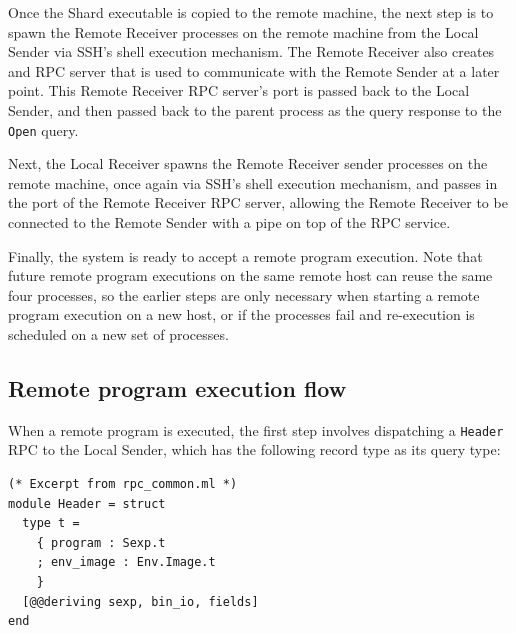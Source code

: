 \documentclass[oneside]{report}
\newcommand{\todoi}[1]{\todo[inline, color=blue!20]{TODO: {#1}}}
\begin{document}
Once the Shard executable is copied to the remote machine, the next step is to spawn the Remote Receiver processes on the remote machine from the Local Sender via SSH's shell execution mechanism.
The Remote Receiver also creates and RPC server that is used to communicate with the Remote Sender at a later point.
This Remote Receiver RPC server's port is passed back to the Local Sender, and then passed back to the parent process as the query response to the \texttt{Open} query.

Next, the Local Receiver spawns the Remote Receiver sender processes on the remote machine, once again via SSH's shell execution mechanism, and passes in the port of the Remote Receiver RPC server, allowing the Remote Receiver to be connected to the Remote Sender with a pipe on top of the RPC service.

Finally, the system is ready to accept a remote program execution.
Note that future remote program executions on the same remote host can reuse the same four processes, so the earlier steps are only necessary when starting a remote program execution on a new host, or if the processes fail and re-execution is scheduled on a new set of processes.

\subsection{Remote program execution flow}

When a remote program is executed, the first step involves dispatching a \texttt{Header} RPC to the Local Sender, which has the following record type as its query type:

\begin{minipage}[c]{\textwidth-15pt}
  \begin{lstlisting}
(* Excerpt from rpc_common.ml *)
module Header = struct
  type t =
    { program : Sexp.t
    ; env_image : Env.Image.t
    }
  [@@deriving sexp, bin_io, fields]
end
\end{lstlisting}
  \smallskip
\end{minipage}

\end{document}
